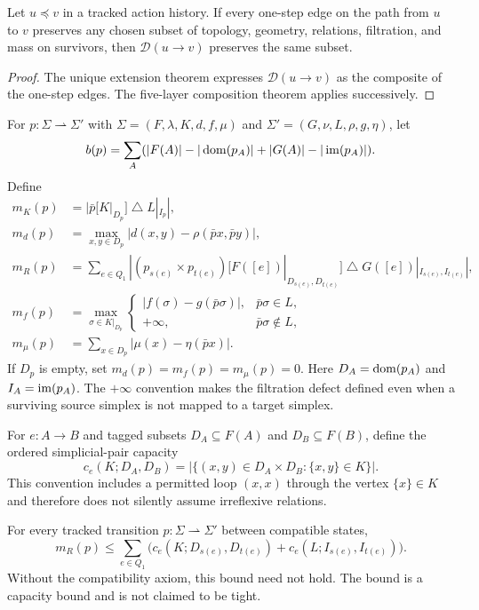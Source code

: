 \begin{theorem}
Let $u\preceq v$ in a tracked action history. If every one-step edge on the path
from $u$ to $v$ preserves any chosen subset of topology, geometry, relations,
filtration, and mass on survivors, then $\mathcal D(u\to v)$ preserves the same
subset.
\end{theorem}

\begin{proof}
The unique extension theorem expresses $\mathcal D(u\to v)$ as the composite of
the one-step edges. The five-layer composition theorem applies successively.
\end{proof}

\begin{definition}
For $p:\Sigma\rightharpoonup\Sigma'$ with
$\Sigma=(F,\lambda,K,d,f,\mu)$ and
$\Sigma'=(G,\nu,L,\rho,g,\eta)$, let
\[
b(p)=\sum_A(|F(A)|-|\operatorname{dom}(p_A)|+|G(A)|-|\operatorname{im}(p_A)|).
\]
Define
\begin{align*}
m_K(p)&=|\bar p[K|_{D_p}]\mathbin{\triangle}L|_{I_p}|,\\
m_d(p)&=\max_{x,y\in D_p}|d(x,y)-\rho(\bar p x,\bar p y)|,\\
m_R(p)&=\sum_{e\in Q_1}|(p_{s(e)}\times p_{t(e)})
 [F([e])|_{D_{s(e)},D_{t(e)}}]\mathbin{\triangle}
 G([e])|_{I_{s(e)},I_{t(e)}}|,\\
m_f(p)&=\max_{\sigma\in K|_{D_p}}
\begin{cases}
|f(\sigma)-g(\bar p\sigma)|,&\bar p\sigma\in L,\\
+\infty,&\bar p\sigma\notin L,
\end{cases}\\
m_\mu(p)&=\sum_{x\in D_p}|\mu(x)-\eta(\bar p x)|.
\end{align*}
If $D_p$ is empty, set $m_d(p)=m_f(p)=m_\mu(p)=0$. Here
$D_A=\operatorname{dom}(p_A)$ and $I_A=\operatorname{im}(p_A)$. The $+\infty$ convention makes the
filtration defect defined even when a surviving source simplex is not mapped to
a target simplex.
\end{definition}

For $e:A\to B$ and tagged subsets $D_A\subseteq F(A)$ and
$D_B\subseteq F(B)$, define the ordered simplicial-pair capacity
\[
c_e(K;D_A,D_B)=
\bigl|\{(x,y)\in D_A\times D_B:\{x,y\}\in K\}\bigr|.
\]
This convention includes a permitted loop $(x,x)$ through the vertex
$\{x\}\in K$ and therefore does not silently assume irreflexive relations.

\begin{proposition}
For every tracked transition $p:\Sigma\rightharpoonup\Sigma'$ between
compatible states,
\[
m_R(p)\leq
\sum_{e\in Q_1}\bigl(c_e(K;D_{s(e)},D_{t(e)})
+c_e(L;I_{s(e)},I_{t(e)})\bigr).
\]
Without the compatibility axiom, this bound need not hold.
The bound is a capacity bound and is not claimed to be tight.
\end{proposition}

